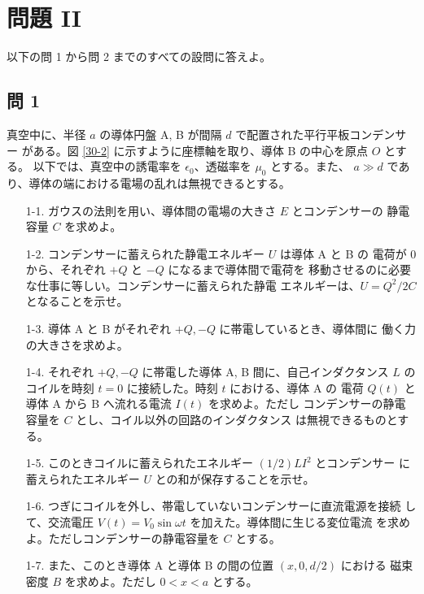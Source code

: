 \documentclass[report]{dennou777}
\begin{document}
\section{問題 II}
以下の問 1 から問 2 までのすべての設問に答えよ。

\subsection*{問 1}
真空中に、半径 $a$ の導体円盤 A, B が間隔 $d$ で配置された平行平板コンデンサー
がある。図 \ref{30-2} に示すように座標軸を取り、導体 B の中心を原点 $O$ とする。
以下では、真空中の誘電率を $\epsilon_0$、透磁率を $\mu_0$ とする。また、
$a\gg d$ であり、導体の端における電場の乱れは無視できるとする。

\begin{itemize}
	\item[1-1.] ガウスの法則を用い、導体間の電場の大きさ $E$ とコンデンサーの
		静電容量 $C$ を求めよ。
	\item[1-2.] コンデンサーに蓄えられた静電エネルギー $U$ は導体 A と B の
		電荷が $0$ から、それぞれ $+Q$ と $-Q$ になるまで導体間で電荷を
		移動させるのに必要な仕事に等しい。コンデンサーに蓄えられた静電
		エネルギーは、$U=Q^2/2C$ となることを示せ。
	\item[1-3.] 導体 A と B がそれぞれ $+Q, -Q$ に帯電しているとき、導体間に
		働く力の大きさを求めよ。
	\item[1-4.] それぞれ $+Q, -Q$ に帯電した導体 A, B 間に、自己インダクタンス
		$L$ のコイルを時刻 $t=0$ に接続した。時刻 $t$ における、導体 A の
		電荷 $Q(t)$ と導体 A から B へ流れる電流 $I(t)$ を求めよ。ただし
		コンデンサーの静電容量を $C$ とし、コイル以外の回路のインダクタンス
		は無視できるものとする。
	\item[1-5.] このときコイルに蓄えられたエネルギー $(1/2)LI^2$ とコンデンサー
		に蓄えられたエネルギー $U$ との和が保存することを示せ。
	\item[1-6.] つぎにコイルを外し、帯電していないコンデンサーに直流電源を接続
		して、交流電圧 $V(t)=V_0\sin\omega t$ を加えた。導体間に生じる変位電流
		を求めよ。ただしコンデンサーの静電容量を $C$ とする。
	\item[1-7.] また、このとき導体 A と導体 B の間の位置 $(x,0,d/2)$ における
		磁束密度 $B$ を求めよ。ただし $0<x<a$ とする。
\end{itemize}
\end{document}
